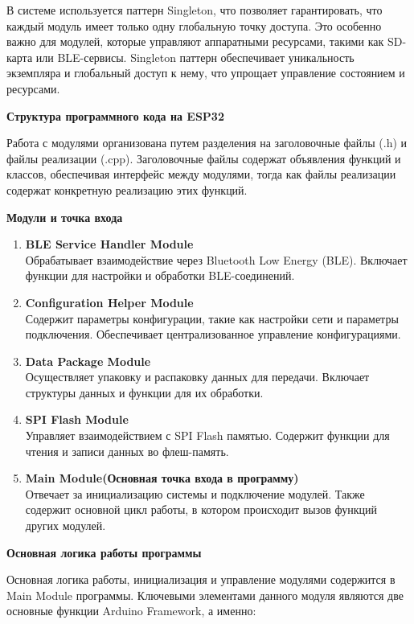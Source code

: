 \documentclass[12pt, russian]{extarticle}
\begin{document}
\begin{spacing}{1.5}
В системе используется паттерн Singleton, что позволяет гарантировать, что каждый модуль имеет только одну глобальную точку доступа. Это особенно важно для модулей, которые управляют аппаратными ресурсами, такими как SD-карта или BLE-сервисы. Singleton паттерн обеспечивает уникальность экземпляра и глобальный доступ к нему, что упрощает управление состоянием и ресурсами.

\par \noindent \textbf{Структура программного кода на ESP32}

Работа с модулями организована путем разделения на заголовочные файлы (.h) и файлы реализации (.cpp). Заголовочные файлы содержат объявления функций и классов, обеспечивая интерфейс между модулями, тогда как файлы реализации содержат конкретную реализацию этих функций.

\par \noindent \textbf{Модули и точка входа}

\begin{enumerate}
    \item \textbf{BLE Service Handler Module} \\
        Обрабатывает взаимодействие через Bluetooth Low Energy (BLE). Включает функции для настройки и обработки BLE-соединений.
    \item \textbf{Configuration Helper Module} \\
        Содержит параметры конфигурации, такие как настройки сети и параметры подключения. Обеспечивает централизованное управление конфигурациями.
    \item \textbf{Data Package Module} \\
        Осуществляет упаковку и распаковку данных для передачи. Включает структуры данных и функции для их обработки.
    \item \textbf{SPI Flash Module} \\
        Управляет взаимодействием с SPI Flash памятью. Содержит функции для чтения и записи данных во флеш-память.
    \item \textbf{Main Module(Основная точка входа в программу)} \\
     Отвечает за инициализацию системы и подключение модулей. Также содержит основной цикл работы, в котором происходит вызов функций других модулей.
\end{enumerate}

\par \noindent \textbf{Основная логика работы программы}

Основная логика работы, инициализация и управление модулями содержится в Main Module программы. Ключевыми элементами данного модуля являются две основные функции Arduino Framework, а именно:


\end{spacing}
\end{document}
